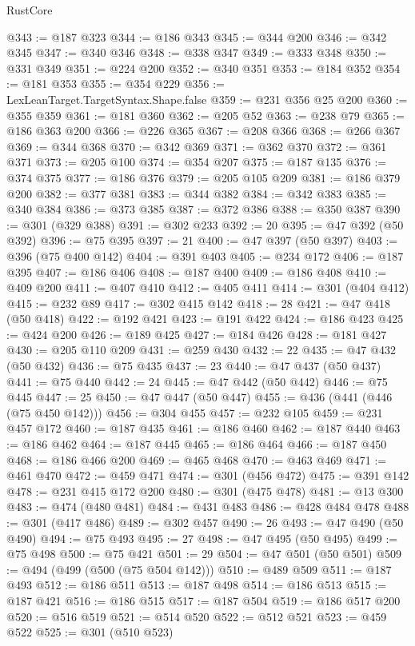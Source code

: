 \begin{lexlean}{RustCore}
\begin{coremodule}
@343 := @187 @323
@344 := @186 @343
@345 := @344 @200
@346 := @342 @345
@347 := @340 @346
@348 := @338 @347
@349 := @333 @348
@350 := @331 @349
@351 := @224 @200
@352 := @340 @351
@353 := @184 @352
@354 := @181 @353
@355 := @354 @229
@356 := LexLeanTarget.TargetSyntax.Shape.false
@359 := @231 @356 @25 @200
@360 := @355 @359
@361 := @181 @360
@362 := @205 @52
@363 := @238 @79
@365 := @186 @363 @200
@366 := @226 @365
@367 := @208 @366
@368 := @266 @367
@369 := @344 @368
@370 := @342 @369
@371 := @362 @370
@372 := @361 @371
@373 := @205 @100
@374 := @354 @207
@375 := @187 @135
@376 := @374 @375
@377 := @186 @376
@379 := @205 @105 @209
@381 := @186 @379 @200
@382 := @377 @381
@383 := @344 @382
@384 := @342 @383
@385 := @340 @384
@386 := @373 @385
@387 := @372 @386
@388 := @350 @387
@390 := @301 (@329 @388)
@391 := @302 @233
@392 := 20
@395 := @47 @392 (@50 @392)
@396 := @75 @395
@397 := 21
@400 := @47 @397 (@50 @397)
@403 := @396 (@75 @400 @142)
@404 := @391 @403
@405 := @234 @172
@406 := @187 @395
@407 := @186 @406
@408 := @187 @400
@409 := @186 @408
@410 := @409 @200
@411 := @407 @410
@412 := @405 @411
@414 := @301 (@404 @412)
@415 := @232 @89
@417 := @302 @415 @142
@418 := 28
@421 := @47 @418 (@50 @418)
@422 := @192 @421
@423 := @191 @422
@424 := @186 @423
@425 := @424 @200
@426 := @189 @425
@427 := @184 @426
@428 := @181 @427
@430 := @205 @110 @209
@431 := @259 @430
@432 := 22
@435 := @47 @432 (@50 @432)
@436 := @75 @435
@437 := 23
@440 := @47 @437 (@50 @437)
@441 := @75 @440
@442 := 24
@445 := @47 @442 (@50 @442)
@446 := @75 @445
@447 := 25
@450 := @47 @447 (@50 @447)
@455 := @436 (@441 (@446 (@75 @450 @142)))
@456 := @304 @455
@457 := @232 @105
@459 := @231 @457 @172
@460 := @187 @435
@461 := @186 @460
@462 := @187 @440
@463 := @186 @462
@464 := @187 @445
@465 := @186 @464
@466 := @187 @450
@468 := @186 @466 @200
@469 := @465 @468
@470 := @463 @469
@471 := @461 @470
@472 := @459 @471
@474 := @301 (@456 @472)
@475 := @391 @142
@478 := @231 @415 @172 @200
@480 := @301 (@475 @478)
@481 := @13 @300
@483 := @474 (@480 @481)
@484 := @431 @483
@486 := @428 @484 @478
@488 := @301 (@417 @486)
@489 := @302 @457
@490 := 26
@493 := @47 @490 (@50 @490)
@494 := @75 @493
@495 := 27
@498 := @47 @495 (@50 @495)
@499 := @75 @498
@500 := @75 @421
@501 := 29
@504 := @47 @501 (@50 @501)
@509 := @494 (@499 (@500 (@75 @504 @142)))
@510 := @489 @509
@511 := @187 @493
@512 := @186 @511
@513 := @187 @498
@514 := @186 @513
@515 := @187 @421
@516 := @186 @515
@517 := @187 @504
@519 := @186 @517 @200
@520 := @516 @519
@521 := @514 @520
@522 := @512 @521
@523 := @459 @522
@525 := @301 (@510 @523)

\end{coremodule}
\end{lexlean}
